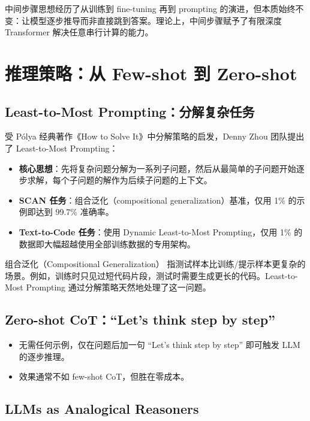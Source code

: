 \documentclass[a4paper]{article}
\begin{document}
中间步骤思想经历了从训练到 fine-tuning 再到 prompting 的演进，但本质始终不变：让模型逐步推导而非直接跳到答案。理论上，中间步骤赋予了有限深度 Transformer 解决任意串行计算的能力。

\section{推理策略：从 Few-shot 到 Zero-shot}

\subsection{Least-to-Most Prompting：分解复杂任务}

受 P\'{o}lya 经典著作《How to Solve It》中分解策略的启发，Denny Zhou 团队提出了 Least-to-Most Prompting：

\begin{itemize}
    \item \textbf{核心思想}：先将复杂问题分解为一系列子问题，然后从最简单的子问题开始逐步求解，每个子问题的解作为后续子问题的上下文。
    \item \textbf{SCAN 任务}：组合泛化（compositional generalization）基准，仅用 1\% 的示例即达到 99.7\% 准确率。
    \item \textbf{Text-to-Code 任务}：使用 Dynamic Least-to-Most Prompting，仅用 1\% 的数据即大幅超越使用全部训练数据的专用架构。
\end{itemize}

\begin{knowledgebox}{组合泛化（Compositional Generalization）}
指测试样本比训练/提示样本更复杂的场景。例如，训练时只见过短代码片段，测试时需要生成更长的代码。Least-to-Most Prompting 通过分解策略天然地处理了这一问题。
\end{knowledgebox}

\subsection{Zero-shot CoT：``Let's think step by step''}

\begin{itemize}
    \item 无需任何示例，仅在问题后加一句 ``Let's think step by step'' 即可触发 LLM 的逐步推理。
    \item 效果通常不如 few-shot CoT，但胜在零成本。
\end{itemize}

\subsection{LLMs as Analogical Reasoners}
\end{document}

